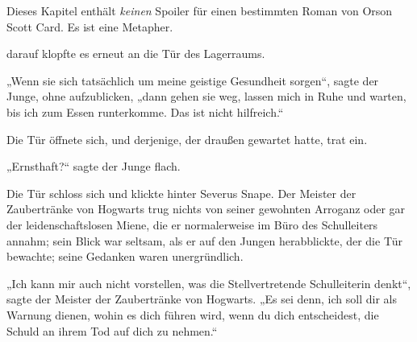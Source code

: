 
\begin{chapterOpeningAuthorNote}
Dieses Kapitel enthält \emph{keinen} Spoiler für einen bestimmten Roman von Orson Scott Card. Es ist eine Metapher.
\end{chapterOpeningAuthorNote}

 darauf klopfte es erneut an die Tür des Lagerraums.

\hplettrineextrapara
„Wenn sie sich tatsächlich um meine geistige Gesundheit sorgen“, sagte der Junge, ohne aufzublicken, „dann gehen sie weg, lassen mich in Ruhe und warten, bis ich zum Essen runterkomme. Das ist nicht hilfreich.“

Die Tür öffnete sich, und derjenige, der draußen gewartet hatte, trat ein.

„Ernsthaft?“ sagte der Junge flach.


Die Tür schloss sich und klickte hinter Severus Snape. Der Meister der Zaubertränke von Hogwarts trug nichts von seiner gewohnten Arroganz oder gar der leidenschaftslosen Miene, die er normalerweise im Büro des Schulleiters annahm; sein Blick war seltsam, als er auf den Jungen herabblickte, der die Tür bewachte; seine Gedanken waren unergründlich.

„Ich kann mir auch nicht vorstellen, was die Stellvertretende Schulleiterin denkt“, sagte der Meister der Zaubertränke von Hogwarts.
„Es sei denn, ich soll dir als Warnung dienen, wohin es dich führen wird, wenn du dich entscheidest, die Schuld an ihrem Tod auf dich zu nehmen.“

